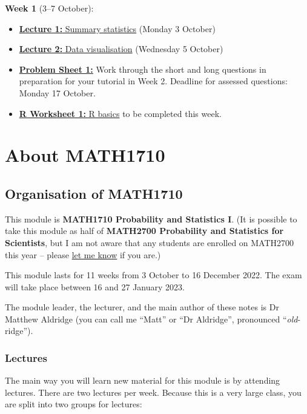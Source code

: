 \documentclass[
  a4paper,
]{book}
\providecommand{\tightlist}{%
  \setlength{\itemsep}{0pt}\setlength{\parskip}{0pt}}
\theoremstyle{definition}
\theoremstyle{definition}
\theoremstyle{definition}
\theoremstyle{definition}
\theoremstyle{remark}
\begin{document}
\textbf{Week 1} (3--7 October):

\begin{itemize}
\tightlist
\item
  \protect\hyperlink{L01-stats}{\textbf{Lecture 1:} Summary statistics} (Monday 3 October)
\item
  \protect\hyperlink{L02-dataviz}{\textbf{Lecture 2:} Data visualisation} (Wednesday 5 October)
\item
  \protect\hyperlink{P1}{\textbf{Problem Sheet 1:}} Work through the short and long questions in preparation for your tutorial in Week 2. Deadline for assessed questions: Monday 17 October.
\item
  \protect\hyperlink{r-work}{\textbf{R Worksheet 1:} R basics} to be completed this week.
\end{itemize}

\hypertarget{about}{%
\chapter*{About MATH1710}\label{about}}

\hypertarget{organisation}{%
\section*{Organisation of MATH1710}\label{organisation}}

This module is \textbf{MATH1710 Probability and Statistics I}. (It is possible to take this module as half of \textbf{MATH2700 Probability and Statistics for Scientists}, but I am not aware that any students are enrolled on MATH2700 this year -- please \href{mailto:m.aldridge@leeds.ac.uk}{let me know} if you are.)

This module lasts for 11 weeks from 3 October to 16 December 2022. The exam will take place between 16 and 27 January 2023.

The module leader, the lecturer, and the main author of these notes is Dr Matthew Aldridge (you can call me ``Matt'' or ``Dr Aldridge'', pronounced ``\emph{old}-ridge'').

\hypertarget{lectures}{%
\subsection*{Lectures}\label{lectures}}

The main way you will learn new material for this module is by attending lectures. There are two lectures per week. Because this is a very large class, you are split into two groups for lectures:
\end{document}
